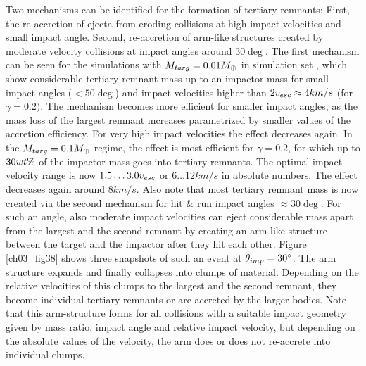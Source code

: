 Two mechanisms can be identified for the formation of tertiary remnants: First, the re-accretion of ejecta from eroding collisions at high impact velocities and small impact angle. Second, re-accretion of arm-like structures created by moderate velocity collisions at impact angles around $30 \deg$. The first mechanism can be seen for the simulations with $M_{targ} = 0.01 M_{\oplus}$ in simulation set \css, which show considerable tertiary remnant mass up to an impactor mass for small impact angles ($< 50 \deg$) and impact velocities higher than $2 v_{esc} \approx 4 km/s$ (for $\gamma = 0.2)$. The mechanism becomes more efficient for smaller impact angles, as the mass loss of the largest remnant increases parametrized by smaller values of the accretion efficiency. For very high impact velocities the effect decreases again. In the $M_{targ} = 0.1 M_{\oplus}$ regime, the effect is most efficient for $\gamma = 0.2$, for which up to $30wt\mathrm{\%}$ of the impactor mass goes into tertiary remnants. The optimal impact velocity range is now $1.5 \dots 3.0 v_{esc}$ or $6 \dots 12 km/s$ in absolute numbers. The effect decreases again around $8 km/s$. Also note that most tertiary remnant mass is now created via the second mechanism for hit \& run impact angles $\approx 30 \deg$. For such an angle, also moderate impact velocities can eject considerable mass apart from the largest and the second remnant by creating an arm-like structure between the target and the impactor after they hit each other. Figure \ref{ch03_fig38} shows three snapshots of such an event at $\theta_{imp} = 30 ^\circ$. The arm structure expands and finally collapses into clumps of material. Depending on the relative velocities of this clumps to the largest and the second remnant, they become individual tertiary remnants or are accreted by the larger bodies. Note that this arm-structure forms for all collisions with a suitable impact geometry given by mass ratio, impact angle and relative impact velocity, but depending on the absolute values of the velocity, the arm does or does not re-accrete into individual clumps.

